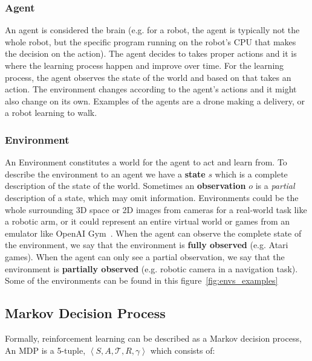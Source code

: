 \subsubsection{Agent}\label{Agent}

An agent is considered the brain (e.g. for a robot, the agent is typically not the whole robot, but the specific program running on the robot's CPU that makes the decision on the action). The agent decides to takes proper actions and it is where the learning process happen and improve over time. For the learning process, the agent observes the state of the world and based on that takes an action. The environment changes according to the agent's actions and it might also change on its own. Examples of the agents are a drone making a delivery, or a robot learning to walk.

\subsubsection{Environment}\label{Environment}

An Environment constitutes a world for the agent to act and learn from. To describe the environment to an agent we have a \textbf{state} \(s\) which is a complete description of the state of the world. Sometimes an \textbf{observation} \(o\) is a \textit{partial} description of a state, which may omit information. Environments could be the whole surrounding 3D space or 2D images from cameras for a real-world task like a robotic arm, or it could represent an entire virtual world or games from an emulator like OpenAI Gym~\parencite{brockman2016openai}. When the agent can observe the complete state of the environment, we say that the environment is \textbf{fully observed} (e.g. Atari games). When the agent can only see a partial observation, we say that the environment is \textbf{partially observed} (e.g. robotic camera in a navigation task).
Some of the environments can be found in this figure~\ref{fig:envs_examples}



\subsection{Markov Decision Process}

Formally, reinforcement learning can be described as a Markov decision process, An MDP is a 5-tuple, $ \left\langle S, A, \mathcal{T}, R, \gamma \right\rangle $ which consists of:

